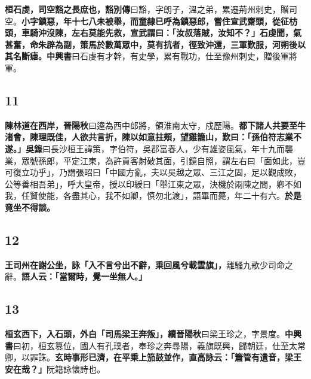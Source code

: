 \textbf{桓石虔，司空豁之長庶也，}{\footnotesize \textbf{豁別傳}曰豁，字朗子，溫之弟，累遷荊州刺史，贈司空。}\textbf{小字鎮惡，年十七八未被舉，而童隸已呼為鎮惡郎，嘗住宣武齋頭，從征枋頭，車騎沖沒陳，左右莫能先救，宣武謂曰：「汝叔落賊，汝知不？」石虔聞，氣甚奮，命朱辟為副，策馬於數萬眾中，莫有抗者，徑致沖還，三軍歎服，河朔後以其名斷瘧。}{\footnotesize \textbf{中興書}曰石虔有才幹，有史學，累有戰功，仕至豫州刺史，贈後軍將軍。}

\subsection*{11}

\textbf{陳林道在西岸，}{\footnotesize \textbf{晉陽秋}曰逵為西中郎將，領淮南太守，戍歷陽。}\textbf{都下諸人共要至牛渚會，陳理既佳，人欲共言折，陳以如意拄頰，望雞籠山，歎曰：「孫伯符志業不遂。」}{\footnotesize \textbf{吳錄}曰長沙桓王諱策，字伯符，吳郡富春人，少有雄姿風氣，年十九而襲業，眾號孫郎，平定江東，為許貢客射破其面，引鏡自照，謂左右曰「面如此，豈可復立功乎」，乃謂張昭曰「中國方亂，夫以吳越之眾、三江之固，足以觀成敗，公等善相吾弟」，呼大皇帝，授以印綬曰「舉江東之眾，決機於兩陳之間，卿不如我，任賢使能，各盡其心，我不如卿，慎勿北渡」，語畢而薨，年二十有六。}\textbf{於是竟坐不得談。}

\subsection*{12}

\textbf{王司州在謝公坐，詠「入不言兮出不辭，乘回風兮載雲旗」，}{\footnotesize 離騷九歌少司命之辭。}\textbf{語人云：「當爾時，覺一坐無人。」}

\subsection*{13}

\textbf{桓玄西下，入石頭，外白「司馬梁王奔叛」，}{\footnotesize \textbf{續晉陽秋}曰梁王珍之，字景度。\textbf{中興書}曰初，桓玄篡位，國人有孔璞者，奉珍之奔尋陽，義旗既興，歸朝廷，仕至太常卿，以罪誅。}\textbf{玄時事形已濟，在平乘上笳鼓並作，直高詠云：「簫管有遺音，梁王安在哉？」}{\footnotesize 阮籍詠懷詩也。}